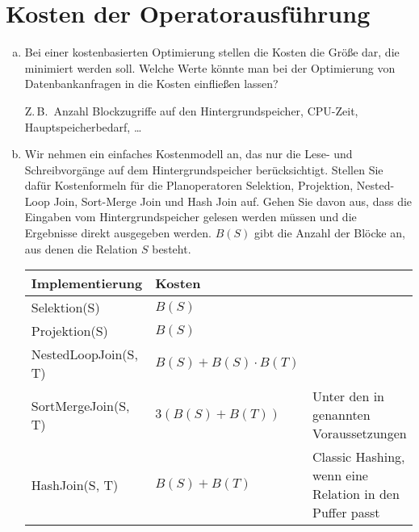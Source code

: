 \section{Kosten der Operatorausführung}
\label{sec:kosten}

\begin{enumerate}[a)]

\item Bei einer kostenbasierten Optimierung stellen die Kosten die Größe dar, die minimiert werden soll.
	Welche Werte könnte man bei der Optimierung von Datenbankanfragen in die Kosten einfließen lassen?

	\begin{solution}
		Z.\,B.\ Anzahl Blockzugriffe auf den Hintergrundspeicher, CPU-Zeit, Hauptspeicherbedarf, \ldots
	\end{solution}

\item \label{item:kostenformeln} Wir nehmen ein einfaches Kostenmodell an, das nur die Lese- und Schreibvorgänge auf dem Hintergrundspeicher berücksichtigt.
	Stellen Sie dafür Kostenformeln für die Planoperatoren Selektion, Projektion, Nested-Loop Join, Sort-Merge Join und Hash Join auf.
	Gehen Sie davon aus, dass die Eingaben vom Hintergrundspeicher gelesen werden müssen und die Ergebnisse direkt ausgegeben werden.
	\(B(S)\) gibt die Anzahl der Blöcke an, aus denen die Relation \(S\) besteht.

	\begin{solution}
		\begin{tabular}{l l p{5cm}}
			\hline
			\textbf{Implementierung} & \textbf{Kosten}          &                                                         \\ \hline
			Selektion(S)             & $B(S)$                   &                                                         \\ \hline
			Projektion(S)            & $B(S)$                   &                                                         \\ \hline
			NestedLoopJoin(S, T)     & $B(S) + B(S) \cdot B(T)$ &                                                         \\ \hline
			SortMergeJoin(S, T)      & $3 (B(S) + B(T))$        & Unter den in \SortMergeJoin genannten Voraussetzungen   \\ \hline
			HashJoin(S, T)           & $B(S) + B(T)$            & Classic Hashing, wenn eine Relation in den Puffer passt \\ \hline
		\end{tabular}


\end{solution}
\end{enumerate}
